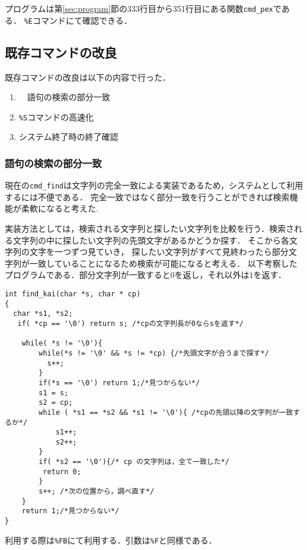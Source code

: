 \documentclass[a4j,11pt]{jarticle}
\begin{document}
プログラムは第\ref{sec:program}節の333行目から351行目にある関数\verb|cmd_pex|である．
\verb|%E|コマンドにて確認できる．
\subsection{既存コマンドの改良}\label{sec:kison}
既存コマンドの改良は以下の内容で行った．
\begin{enumerate}
\setlength{\parskip}{2pt} \setlength{\itemsep}{2pt}
    \item　語句の検索の部分一致
    \item \verb|%S|コマンドの高速化
    \item システム終了時の終了確認
\end{enumerate}
\subsubsection{語句の検索の部分一致}
現在の\verb|cmd_find|は文字列の完全一致による実装であるため，システムとして利用するには不便である．
完全一致ではなく部分一致を行うことができれば検索機能が柔軟になると考えた.

実装方法としては，検索される文字列と探したい文字列を比較を行う．検索される文字列の中に探したい文字列の先頭文字があるかどうか探す．
そこから各文字列の文字を一つずつ見ていき，
探したい文字列がすべて見終わったら部分文字列が一致していることになるため検索が可能になると考える．
以下考察したプログラムである．部分文字列が一致すると$0$を返し，それ以外は$1$を返す．
\begin{verbatim}
int find_kai(char *s, char * cp)
{
  char *s1, *s2;
   if( *cp == '\0') return s; /*cpの文字列長が0ならsを返す*/ 

    while( *s != '\0'){
        while(*s != '\0' && *s != *cp) {/*先頭文字が合うまで探す*/
          s++;
        }
        if(*s == '\0') return 1;/*見つからない*/
        s1 = s;
        s2 = cp;
        while ( *s1 == *s2 && *s1 != '\0'){ /*cpの先頭以降の文字列が一致するか*/
            s1++;
            s2++;
        }
        if( *s2 == '\0'){/* cp の文字列は，全て一致した*/
         return 0;
        }
        s++; /*次の位置から，調べ直す*/
    }
    return 1;/*見つからない*/
}
\end{verbatim}
利用する際は\verb|%FB|にて利用する．引数は\verb|%F|と同様である．
\end{document}
